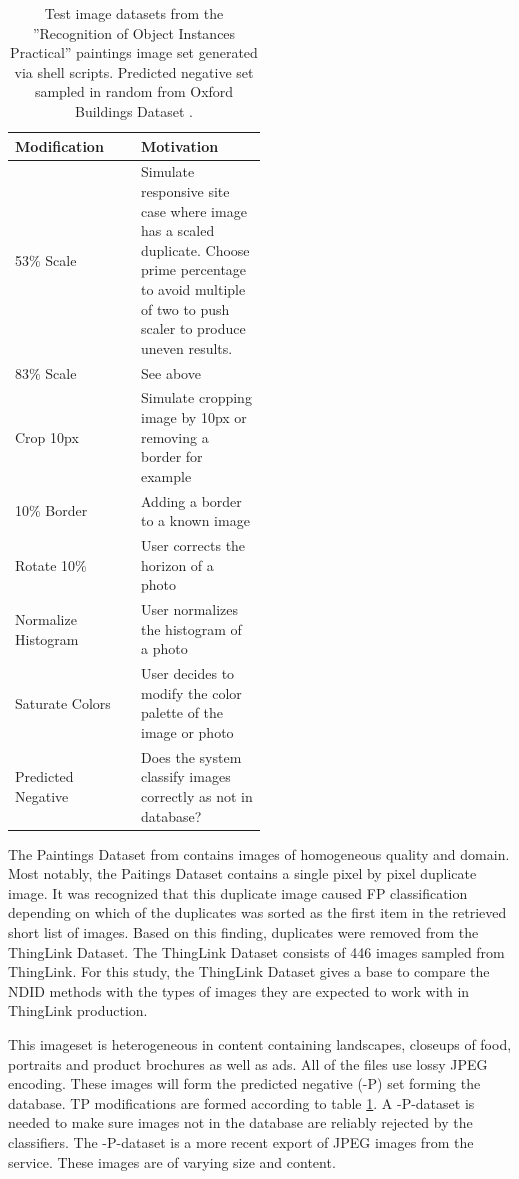 \documentclass[english,12pt,a4paper,pdftex,elec,utf8, table]{aaltothesis}
\begin{document}
\def\arraystretch{1.5}
\begin{table}[htb]
\caption{Test image datasets from the ''Recognition of Object Instances Practical'' \cite{Vedaldi2012} paintings image set generated via shell scripts. Predicted negative set sampled in random from Oxford Buildings Dataset \cite{PhilbinJamesArandjelovicReljaZisserman2012}.}
\label{modifiedimages}
\begin{center}
\begin{tabular}{lp{0.5\linewidth}}
  Modification & Motivation \\
  \hline \hline
  53\% Scale& Simulate responsive site case where image has a scaled duplicate. Choose prime percentage to avoid multiple of two to push scaler to produce uneven results.\\
  \hline
  83\% Scale& See above \\
  \hline
  Crop 10px & Simulate cropping image by 10px or removing a border for example\\
  \hline
  10\% Border & Adding a border to a known image \\
  \hline
  Rotate 10\% & User corrects the horizon of a photo \\
  \hline
  Normalize Histogram & User normalizes the histogram of a photo\\
  \hline
  Saturate Colors & User decides to modify the color palette of the image or photo\\
  \hline
  Predicted Negative & Does the system classify images correctly as not in database?\\
\end{tabular}
\end{center}\end{table}
\clearpage
The Paintings Dataset from \cite{Vedaldi2012} contains images of homogeneous quality and domain. Most notably, the Paitings Dataset contains a single pixel by pixel duplicate image. It was recognized that this duplicate image caused FP classification depending on which of the duplicates was sorted as the first item in the retrieved short list of images. Based on this finding, duplicates were removed from the ThingLink Dataset. The ThingLink Dataset consists of 446 images sampled from ThingLink. For this study, the ThingLink Dataset gives a base to compare the NDID methods with the types of images they are expected to work with in ThingLink production.

This imageset is heterogeneous in content containing landscapes, closeups of food, portraits and product brochures as well as ads. All of the files use lossy JPEG encoding. These images will form the predicted negative (-P) set forming the database. TP modifications are formed according to table \ref{modifiedimages}. A -P-dataset is needed to make sure images not in the database are reliably rejected by the classifiers. The -P-dataset is a more recent export of JPEG images from the service. These images are of varying size and content.
\end{document}
